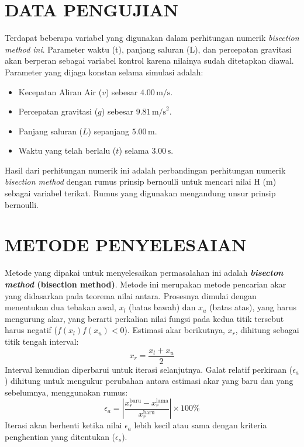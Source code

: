 \documentclass[conference]{IEEEtran}
\begin{document}
\section{DATA PENGUJIAN}
Terdapat beberapa variabel yang digunakan dalam perhitungan numerik \textit{bisection method ini}. Parameter waktu (t), panjang saluran (L), dan percepatan gravitasi akan berperan sebagai variabel kontrol karena nilainya sudah ditetapkan diawal. Parameter yang dijaga konstan selama simulasi adalah:
\begin{itemize}
    \item Kecepatan Aliran Air ($v$) sebesar $4.00 \, \text{m/s}$.
    \item Percepatan gravitasi ($g$) sebesar $9.81 \, \text{m/s}^2$.
    \item Panjang saluran ($L$) sepanjang $5.00 \, \text{m}$.
    \item Waktu yang telah berlalu ($t$) selama $3.00 \, \text{s}$.
\end{itemize}
Hasil dari perhitungan numerik ini adalah perbandingan perhitungan numerik \textit{bisection method} dengan rumus prinsip bernoulli untuk mencari nilai H (m) sebagai variabel terikat. Rumus yang digunakan mengandung unsur prinsip bernoulli. 

\section{METODE PENYELESAIAN}

Metode yang dipakai untuk menyelesaikan permasalahan ini adalah \textbf{\textit{bisecton method} (bisection method)}. Metode ini merupakan metode pencarian akar yang didasarkan pada teorema nilai antara. Prosesnya dimulai dengan menentukan dua tebakan awal, $x_l$ (batas bawah) dan $x_u$ (batas atas), yang harus mengurung akar, yang berarti perkalian nilai fungsi pada kedua titik tersebut harus negatif ($f(x_l)f(x_u) < 0$). Estimasi akar berikutnya, $x_r$, dihitung sebagai titik tengah interval:
\begin{equation}
    x_r = \frac{x_l + x_u}{2}
\end{equation}
Interval kemudian diperbarui untuk iterasi selanjutnya. Galat relatif perkiraan ($\epsilon_a$) dihitung untuk mengukur perubahan antara estimasi akar yang baru dan yang sebelumnya, menggunakan rumus:
\begin{equation}
    \epsilon_a = \left|\frac{x_{r}^{\text{baru}} - x_{r}^{\text{lama}}}{x_{r}^{\text{baru}}}\right| \times 100\%
\end{equation} 
Iterasi akan berhenti ketika nilai $\epsilon_a$ lebih kecil atau sama dengan kriteria penghentian yang ditentukan ($\epsilon_s$).
\end{document}
